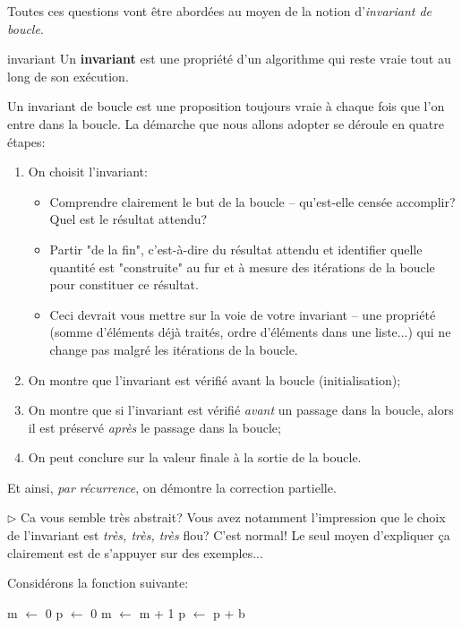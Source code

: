 \documentclass[12pt]{article}
\begin{document}
	Toutes ces questions vont être abordées au moyen de la notion d'\textit{invariant de boucle}.
	
	\begin{MaDef}{invariant}
		Un \textbf{invariant} est une propriété d'un algorithme qui reste vraie tout au long de son exécution.
	\end{MaDef}
	
	Un invariant de boucle est une proposition toujours vraie à chaque fois que l'on entre dans la boucle. La démarche que nous allons adopter se déroule en quatre étapes:
	\begin{enumerate}
		\item On choisit l'invariant:
		\begin{itemize}
			\item Comprendre clairement le but de la boucle -- qu'est-elle censée accomplir? Quel est le résultat attendu?
			\item Partir "de la fin", c'est-à-dire du résultat attendu et identifier quelle quantité est "construite" au fur et à mesure des itérations de la boucle pour constituer ce résultat.
			\item Ceci devrait vous mettre sur la voie de votre invariant -- une propriété (somme d'éléments déjà traités, ordre d'éléments dans une liste...) qui ne change pas malgré les itérations de la boucle.
			\end{itemize}
		\item On montre que l’invariant est vérifié avant la boucle (initialisation);
		\item On montre que si l'invariant est vérifié \textit{avant }un passage dans la boucle, alors il est préservé \textit{après }le passage dans la boucle;
		\item On peut conclure sur la valeur finale à la sortie de la boucle.
	\end{enumerate}
	
	Et ainsi, \textit{par récurrence}, on démontre la correction partielle.
	
	$\rhd$ Ca vous semble très abstrait? Vous avez notamment l'impression que le choix de l'invariant est \textit{très, très, très} flou? C'est normal! Le seul moyen d'expliquer ça clairement est de s'appuyer sur des exemples...
	
	Considérons la fonction suivante:
	\begin{algorithmic}[1]
		\State m $\leftarrow$ 0
		\State p $\leftarrow$ 0
		\State m $\leftarrow$ m + 1
		\State p $\leftarrow$ p + b
		\EndWhile
		\State{}
		\EndFunction
	\end{algorithmic}
	
\end{document}
